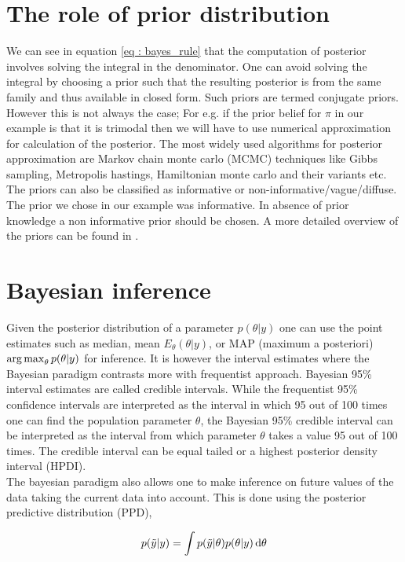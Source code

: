 \section{The role of prior distribution}
We can see in equation \ref{eq : bayes_rule} that the computation of posterior involves solving the integral in the denominator. One can avoid solving the integral by choosing a prior such that the resulting posterior is from the same family and thus available in closed form. Such priors are termed conjugate priors. However this is not always the case; For e.g. if the prior belief for $\pi$ in our example is that it is trimodal then we will have to use numerical approximation for calculation of the posterior. The most widely used algorithms for posterior approximation are Markov chain monte carlo (MCMC) techniques like Gibbs sampling, Metropolis hastings, Hamiltonian monte carlo and their variants etc. The priors can also be classified as informative or non-informative/vague/diffuse. The prior we chose in our example was informative. In absence of prior knowledge a non informative prior should be chosen. A more detailed overview of the priors can be found in \citet{lesaffre_bayesian_2012}.\\

\section{Bayesian inference}
Given the posterior distribution of a parameter $p(\theta|y)$ one can use the point estimates such as median, mean $E_\theta(\theta|y)$, or MAP (maximum a posteriori) $\operatorname*{arg\,max}_\theta p(\theta|y)$ for inference. It is however the interval estimates where the Bayesian paradigm contrasts more with frequentist approach. Bayesian 95\% interval estimates are called credible intervals. While the frequentist 95\% confidence intervals are interpreted as the interval in which 95 out of 100 times one can find the population parameter $\theta$, the Bayesian 95\% credible interval can be interpreted as the interval from which parameter $\theta$ takes a value 95 out of 100 times. The credible interval can be equal tailed or a highest posterior density interval (HPDI).\\

The bayesian paradigm also allows one to make inference on future values of the data taking the current data into account. This is done using the posterior predictive distribution (PPD),

$$p(\tilde{y}|y) = \int p(\tilde{y}|\theta) p(\theta|y) \mathop{}\!\mathrm{d}\theta$$

